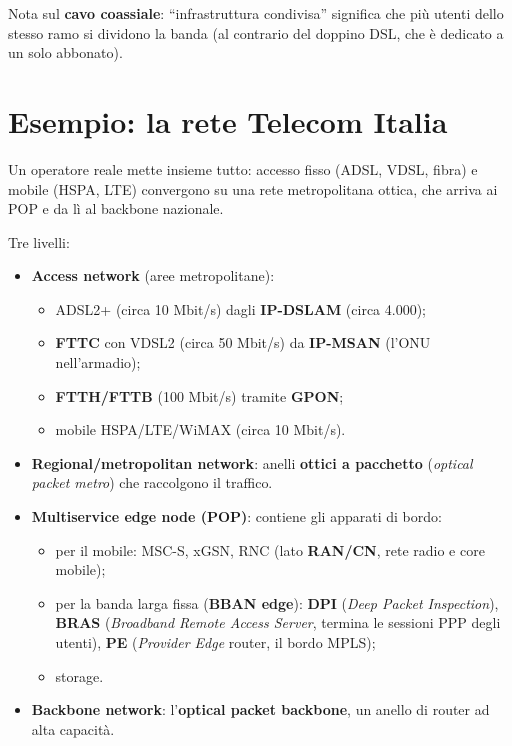 Nota sul \textbf{cavo coassiale}: ``infrastruttura condivisa'' significa che più utenti dello stesso ramo si dividono la banda (al contrario del doppino DSL, che è dedicato a un solo abbonato).

\section{Esempio: la rete Telecom Italia}

\begin{inbreve}

Un operatore reale mette insieme tutto: accesso fisso (ADSL, VDSL, fibra) e mobile (HSPA, LTE) convergono su una rete metropolitana ottica, che arriva ai POP e da lì al backbone nazionale.

\end{inbreve}

Tre livelli:

\begin{itemize}
\tightlist
\item
  \textbf{Access network} (aree metropolitane):

  \begin{itemize}
  \tightlist
  \item
    ADSL2+ (circa 10 Mbit/s) dagli \textbf{IP-DSLAM} (circa 4.000);
  \item
    \textbf{FTTC} con VDSL2 (circa 50 Mbit/s) da \textbf{IP-MSAN} (l'ONU nell'armadio);
  \item
    \textbf{FTTH/FTTB} (100 Mbit/s) tramite \textbf{GPON};
  \item
    mobile HSPA/LTE/WiMAX (circa 10 Mbit/s).
  \end{itemize}
\item
  \textbf{Regional/metropolitan network}: anelli \textbf{ottici a pacchetto} (\emph{optical packet metro}) che raccolgono il traffico.
\item
  \textbf{Multiservice edge node (POP)}: contiene gli apparati di bordo:

  \begin{itemize}
  \tightlist
  \item
    per il mobile: MSC-S, xGSN, RNC (lato \textbf{RAN/CN}, rete radio e core mobile);
  \item
    per la banda larga fissa (\textbf{BBAN edge}): \textbf{DPI} (\emph{Deep Packet Inspection}), \textbf{BRAS} (\emph{Broadband Remote Access Server}, termina le sessioni PPP degli utenti), \textbf{PE} (\emph{Provider Edge} router, il bordo MPLS);
  \item
    storage.
  \end{itemize}
\item
  \textbf{Backbone network}: l'\textbf{optical packet backbone}, un anello di router ad alta capacità.
\end{itemize}

